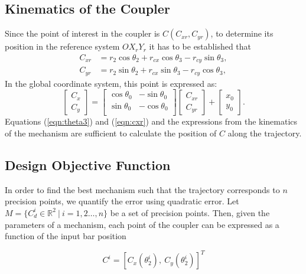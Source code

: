 \documentclass[12pt,letterpape]{article}
\begin{document}
\subsection{Kinematics of the Coupler} %
\label{sec:kinematics_of_the_coupler}
Since the point of interest in the coupler is $C(C_{xr}, C_{yr})$, to determine
its position in the reference system $OX_r Y_r$ it has to be established that
\begin{align}
	C_{xr} &= r_2 \cos\theta_2 + r_{cx}\cos\theta_3 - r_{cy}\sin\theta_3,\\
	C_{yr} &= r_2 \sin\theta_2 + r_{cx}\sin\theta_3 - r_{cy}\cos\theta_3,
\end{align}
In the global coordinate system, this point is expressed as:
\begin{equation}
	\begin{bmatrix}
		C_x \\ C_y
	\end{bmatrix}
	=
	\begin{bmatrix}
		\cos\theta_0 & -\sin\theta_0\\
		\sin\theta_0 & -\cos\theta_0\\
	\end{bmatrix}
	\begin{bmatrix}
		C_{xr} \\ C_{yr}
	\end{bmatrix}
	+\begin{bmatrix}
		x_0 \\ y_0
	\end{bmatrix}.
	\label{eqn:cxr}
\end{equation}
Equations (\ref{eqn:theta3}) and (\ref{eqn:cxr}) and the expressions from the
kinematics of the mechanism are sufficient to calculate the position of
$C$ along the trajectory.

\subsection{Design Objective Function} %

In order to find the best mechanism such that the trajectory corresponds to $n$
precision points, we quantify the error using quadratic error. Let 
$M = \{ C^i_d \in \mathbb{R}^2 \ | \ i =1,2\ldots,n \}$ be a set of precision points.
% 
Then, given the parameters of a mechanism, each point of the coupler can be
expressed as a function of the input bar position

$$
 C^i = [ C_x(\theta_2^i),\ C_y(\theta_2^i)]^T
$$
\end{document}
